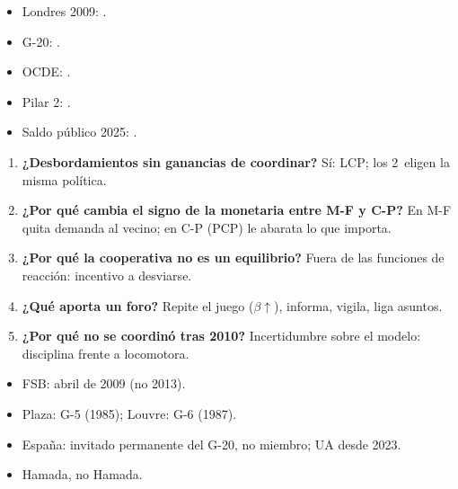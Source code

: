 \documentclass{article}
\begin{document}
\begin{columnas}
\anexorepaso
{}
\begin{itemize}
\item Londres 2009: .
\item G-20: .
\item OCDE: .
\item Pilar 2: .
\item Saldo público 2025: .
\end{itemize}
\begin{enumerate}
\item \textbf{¿Desbordamientos sin ganancias de coordinar?} Sí: LCP; los 2~eligen la misma política.
\item \textbf{¿Por qué cambia el signo de la monetaria entre M-F y C-P?} En M-F quita demanda al vecino; en C-P (PCP) le abarata lo que importa.
\item \textbf{¿Por qué la cooperativa no es un equilibrio?} Fuera de las funciones de reacción: incentivo a desviarse.
\item \textbf{¿Qué aporta un foro?} Repite el juego ($\beta\uparrow$), informa, vigila, liga asuntos.
\item \textbf{¿Por qué no se coordinó tras 2010?} Incertidumbre sobre el modelo: disciplina frente a locomotora.
\end{enumerate}
\begin{trampa}
\begin{itemize}
\item FSB: abril de 2009 (no 2013).
\item Plaza: G-5 (1985); Louvre: G-6 (1987).
\item España: invitado permanente del G-20, no miembro; UA desde 2023.
\item {} Hamada, no  Hamada.
\end{itemize}
\end{trampa}

\end{columnas}
\end{document}
